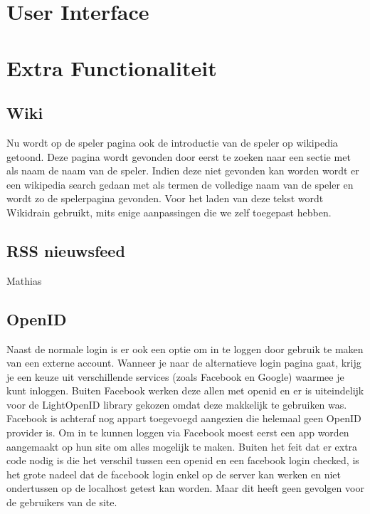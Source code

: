 \documentclass[11pt]{article}
\begin{document}
\section{User Interface}





\section{Extra Functionaliteit}


\subsection{Wiki}

Nu wordt op de speler pagina ook de introductie van de speler op wikipedia getoond.
Deze pagina wordt gevonden door eerst te zoeken naar een sectie met als naam de naam van de speler.
Indien deze niet gevonden kan worden wordt er een wikipedia search gedaan met als termen de volledige naam van de speler en wordt zo de spelerpagina gevonden.
Voor het laden van deze tekst wordt Wikidrain gebruikt, mits enige aanpassingen die we zelf toegepast hebben.


\subsection{RSS nieuwsfeed}

Mathias



\subsection{OpenID}

Naast de normale login is er ook een optie om in te loggen door gebruik te maken van een externe account. Wanneer je naar de alternatieve login pagina gaat, krijg je een keuze uit verschillende services (zoals Facebook en Google) waarmee je kunt inloggen. Buiten Facebook werken deze allen met openid en er is uiteindelijk voor de LightOpenID library gekozen omdat deze makkelijk te gebruiken was. Facebook is achteraf nog appart toegevoegd aangezien die helemaal geen OpenID provider is. Om in te kunnen loggen via Facebook moest eerst een app worden aangemaakt op hun site om alles mogelijk te maken. Buiten het feit dat er extra code nodig is die het verschil tussen een openid en een facebook login checked, is het grote nadeel dat de facebook login enkel op de server kan werken en niet ondertussen op de localhost getest kan worden. Maar dit heeft geen gevolgen voor de gebruikers van de site.
\end{document}
